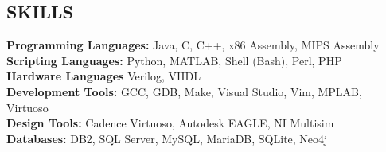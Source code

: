 \documentclass[line,margin]{res}
\begin{document}
\begin{resume}
		\section{SKILLS}
		\textbf{Programming Languages:} Java, C, C++, x86 Assembly, MIPS Assembly\\
		\textbf{Scripting Languages:} Python, MATLAB, Shell (Bash), Perl, PHP\\
		\textbf{Hardware Languages} Verilog, VHDL\\
		\textbf{Development Tools:} GCC, GDB, Make, Visual Studio, Vim, MPLAB, Virtuoso\\
		\textbf{Design Tools:} Cadence Virtuoso, Autodesk  EAGLE, NI Multisim\\
		\textbf{Databases:} DB2, SQL Server, MySQL, MariaDB, SQLite, Neo4j
		
	\end{resume}
\end{document}

